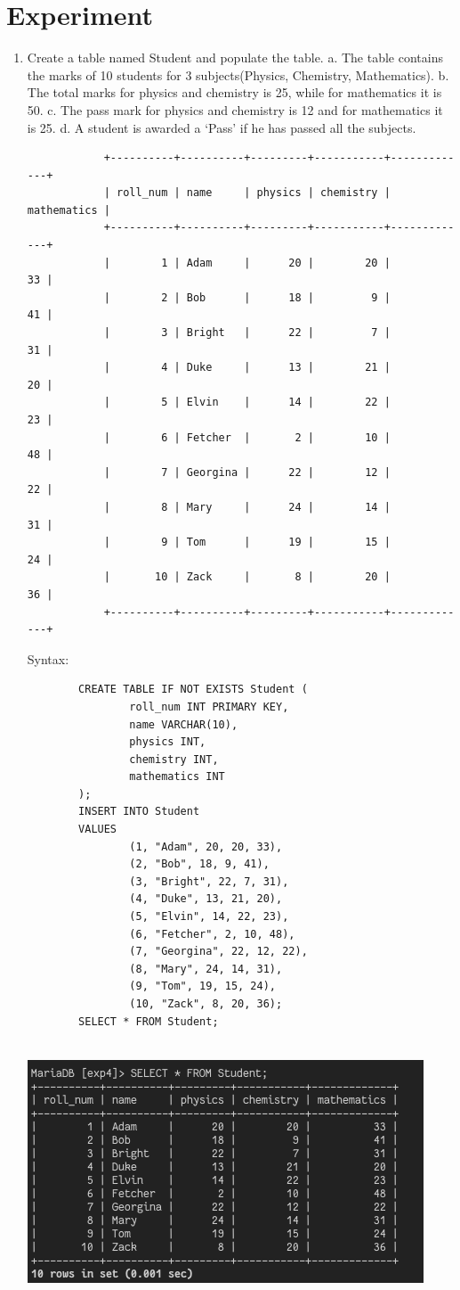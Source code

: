 \documentclass[13pt,oneside]{book}
\begin{document}
\section*{Experiment}
	\begin{enumerate}
		\item
		Create a table named Student and populate the table. 
				a. The table contains the marks of 10 students for 3 subjects(Physics, Chemistry, 
		 Mathematics). 
				b. The total marks for physics and chemistry is 25, while for mathematics it is 50. 
				c. The pass mark for physics and chemistry is 12 and for mathematics it is 25. 
				d. A student is awarded a ‘Pass’ if he has passed all the subjects.
		\begin{verbatim}
			+----------+----------+---------+-----------+-------------+
			| roll_num | name     | physics | chemistry | mathematics |
			+----------+----------+---------+-----------+-------------+
			|        1 | Adam     |      20 |        20 |          33 |
			|        2 | Bob      |      18 |         9 |          41 |
			|        3 | Bright   |      22 |         7 |          31 |
			|        4 | Duke     |      13 |        21 |          20 |
			|        5 | Elvin    |      14 |        22 |          23 |
			|        6 | Fetcher  |       2 |        10 |          48 |
			|        7 | Georgina |      22 |        12 |          22 |
			|        8 | Mary     |      24 |        14 |          31 |
			|        9 | Tom      |      19 |        15 |          24 |
			|       10 | Zack     |       8 |        20 |          36 |
			+----------+----------+---------+-----------+-------------+
		\end{verbatim}
		 
		Syntax:
		\begin{verbatim}
		CREATE TABLE IF NOT EXISTS Student (
				roll_num INT PRIMARY KEY,
				name VARCHAR(10),
				physics INT,
				chemistry INT,
				mathematics INT
		);
		INSERT INTO Student 
		VALUES
				(1, "Adam", 20, 20, 33), 
				(2, "Bob", 18, 9, 41), 
				(3, "Bright", 22, 7, 31),
				(4, "Duke", 13, 21, 20),
				(5, "Elvin", 14, 22, 23),
				(6, "Fetcher", 2, 10, 48),
				(7, "Georgina", 22, 12, 22), 
				(8, "Mary", 24, 14, 31),
				(9, "Tom", 19, 15, 24),
				(10, "Zack", 8, 20, 36);
		SELECT * FROM Student;
		
		\end{verbatim}
		\includegraphics[]{img/p4/ss1.png}
		

\end{enumerate}
\end{document}
